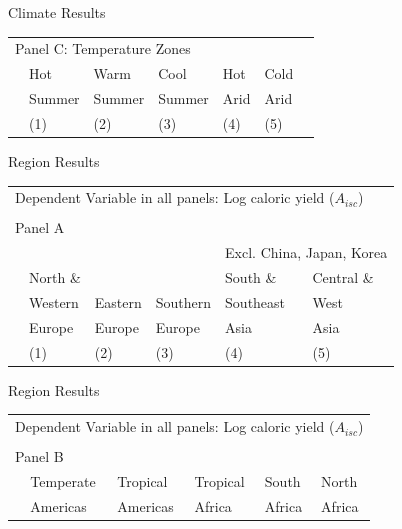 \documentclass[10pt, xcolor=dvipsnames]{beamer}
\begin{document}
\begin{frame}{Climate Results}

{\footnotesize
\begin{tabularx}{\textwidth}{lXXXXXX}
\midrule
\multicolumn{7}{l}{Panel C: Temperature Zones} \\
    & Hot        & Warm        & Cool       & Hot      & Cold     &  \\
    & Summer & Summer & Summer & Arid & Arid &   \\
 & (1) & (2) & (3) & (4) & (5) &  \\    
\midrule

\midrule
\end{tabularx}
}
\end{frame}

\begin{frame}{Region Results}\label{subregiontab}

{\footnotesize
\begin{tabularx}{\textwidth}{lXXXXX}
\midrule
\multicolumn{6}{l}{Dependent Variable in all panels: Log caloric yield ($A_{isc}$)} \\ \\
\multicolumn{6}{l}{Panel A} \\
 &          &         &             &  \multicolumn{2}{c}{Excl. China, Japan, Korea} \\ \cmidrule(lr){5-6}
 & North \& &         &              & South \&  & Central \&             \\
 & Western  & Eastern & Southern     & Southeast & West        \\
 & Europe   & Europe  & Europe       & Asia      & Asia      \\
 & (1) & (2) & (3) & (4) & (5) \\
\midrule

\midrule
\end{tabularx}
}

\hfill \hyperlink{robustness}{}
\end{frame}

\begin{frame}{Region Results}

{\footnotesize
\begin{tabularx}{\textwidth}{lXXXXX}
\midrule
\multicolumn{6}{l}{Dependent Variable in all panels: Log caloric yield ($A_{isc}$)} \\ \\
\multicolumn{6}{l}{Panel B} \\
 & Temperate & Tropical  & Tropical & South    & North    \\
 & Americas  & Americas  & Africa   & Africa   & Africa     \\
\midrule

\midrule
\end{tabularx}
}

\end{frame}
\end{document}
